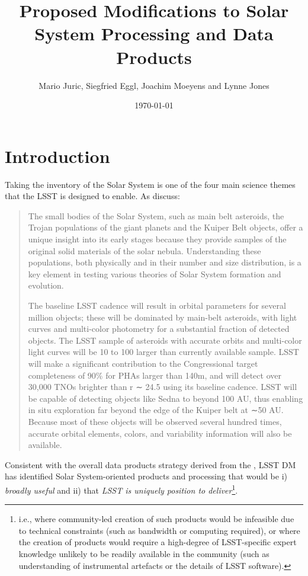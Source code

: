\documentclass[DM,authoryear,toc,lsstdraft]{lsstdoc}
\title[Solar System Data Products Changes]{Proposed Modifications to Solar System Processing and Data Products}
\author{%
Mario Juric,
Siegfried Eggl,
Joachim Moeyens
and Lynne Jones
}
\date{\today}
\begin{document}
\maketitle


\section{Introduction}

Taking the inventory of the Solar System is one of the four main science themes that the LSST is designed to enable. As \cite{2008arXiv0805.2366I} discuss:

\begin{quotation}
The small bodies of the Solar System, such as main belt
asteroids, the Trojan populations of the giant planets
and the Kuiper Belt objects, offer a unique insight
into its early stages because they provide samples of
the original solid materials of the solar nebula. Understanding
these populations, both physically and in their
number and size distribution, is a key element in testing
various theories of Solar System formation and evolution.

The baseline LSST cadence will result in orbital parameters
for several million objects; these will be dominated
by main-belt asteroids, with light curves and
multi-color photometry for a substantial fraction of detected
objects. The LSST sample of asteroids with accurate
orbits and multi-color light curves will be 10 to
100 larger than currently available sample. LSST will
make a significant contribution to the Congressional target
completeness of 90\% for PHAs larger than 140m, and will 
detect over 30,000 TNOs brighter than r ∼ 24.5 using 
its baseline cadence. LSST will be capable
of detecting objects like Sedna to beyond 100 AU,
thus enabling in situ exploration far beyond the edge of
the Kuiper belt at ∼50 AU. Because most of these objects
will be observed several hundred times, accurate
orbital elements, colors, and variability information will
also be available.
\end{quotation}

Consistent with the overall data products strategy derived from the ,
LSST DM has identified Solar System-oriented products and 
processing that would be i) {\em broadly useful} and ii) that 
{\em LSST is uniquely position to deliver}\footnote{i.e., where community-led
creation of such products would be infeasible due to technical
constraints (such as bandwidth or computing required), or where
the creation of products would require a high-degree of LSST-specific
expert knowledge unlikely to be readily available in the community
(such as understanding of instrumental artefacts or the details of
LSST software).}.
\end{document}
